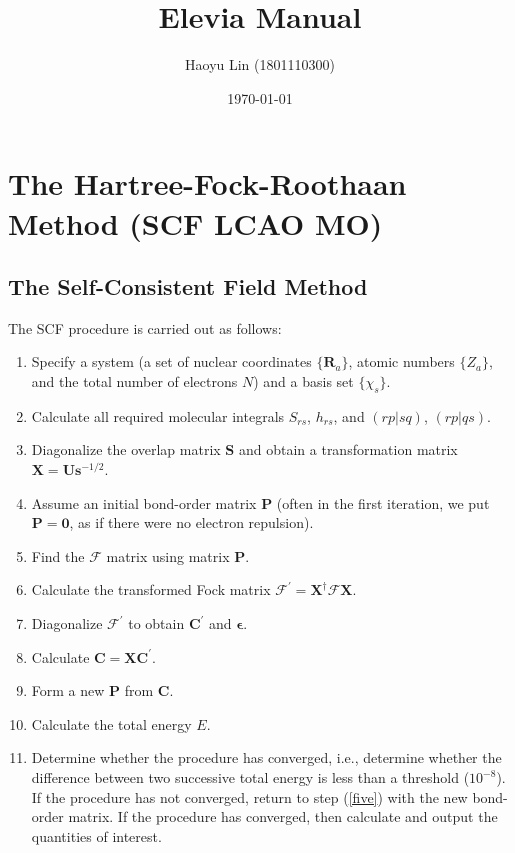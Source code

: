 \documentclass[11pt,a4paper]{article}
\title{Elevia Manual}
\author{Haoyu Lin (1801110300)}
\date{\today}
\begin{document}
	
	\maketitle
	
	\section{The Hartree-Fock-Roothaan Method (SCF LCAO MO)}
	
	\subsection{The Self-Consistent Field Method}
	The SCF procedure is carried out as follows:
	\begin{enumerate}
		\item Specify a system (a set of nuclear coordinates $\{\mathbf{R}_a\}$, atomic numbers $\{Z_a\}$, and the total number of electrons $N$) and a basis set $\{\chi_s\}$. 
		\item Calculate all required molecular integrals $S_{rs}$, $h_{rs}$, and $(rp|sq)$, $(rp|qs)$.
		\item Diagonalize the overlap matrix $\mathbf{S}$ and obtain a transformation matrix $\mathbf{X} = \mathbf{U} \mathbf{s}^{-1/2}$. 
		\item Assume an initial bond-order matrix $\mathbf{P}$ (often in the first iteration, we
		put $\mathbf{P} = \mathbf{0}$, as if there were no electron repulsion).
		\item \label{five} Find the $\boldsymbol{\mathcal{F}}$ matrix using matrix $\mathbf{P}$.
		\item Calculate the transformed Fock matrix $\boldsymbol{\mathcal{F}}^{\prime} = \mathbf{X}^{\dagger} \boldsymbol{\mathcal{F}} \mathbf{X}$.
		\item Diagonalize $\boldsymbol{\mathcal{F}}^{\prime}$ to obtain $\mathbf{C}^{\prime}$ and $\boldsymbol{\epsilon}$. 
		\item Calculate $\mathbf{C} = \mathbf{X} \mathbf{C}^{\prime}$.
		\item Form a new $\mathbf{P}$ from $\mathbf{C}$.
		\item Calculate the total energy $E$.
		\item Determine whether the procedure has converged, i.e., determine whether the difference between two successive total energy is less than a threshold ($10^{-8}$). If the procedure has not converged, return to step (\ref{five}) with the new bond-order matrix. If the procedure has converged, then calculate and output the quantities of interest.
	\end{enumerate}
	
	
	
\end{document}
